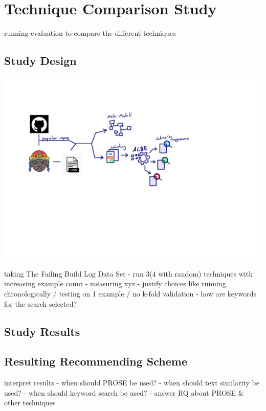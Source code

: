 \documentclass[\myrootdir/main.tex]{subfiles}
\begin{document}
\chapter{Technique Comparison Study}
\label{evaluation}
running evaluation to compare the different techniques

\section{Study Design}
\includegraphics[page=6, width=\textwidth, trim={0.5cm 0.5cm 0.5cm 0.5cm}, clip]{img/flow-of-research.pdf}

taking The Failing Build Log Data Set - run 3(4 with random) techniques with increasing example count - measuring xyz - justify choices like running chronologically / testing on 1 example / no k-fold validation - how are keywords for the search selected?

\section{Study Results}

\section{Resulting Recommending Scheme}

interpret results - when should PROSE be used? - when should text similarity be used? - when should keyword search be used? - answer RQ about PROSE \& other techniques
\end{document}
